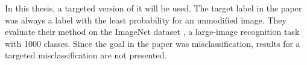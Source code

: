 In this thesis, a targeted version \cite{fgsm-targeted} of it will be used. The target label in the paper was always a label with the least probability for an unmodified image. They evaluate their method on the ImageNet dataset \cite{datasetImageNet}, a large-image recognition task with 1000 classes. Since the goal in the paper was misclassification, results for a targeted misclassification are not presented. 

